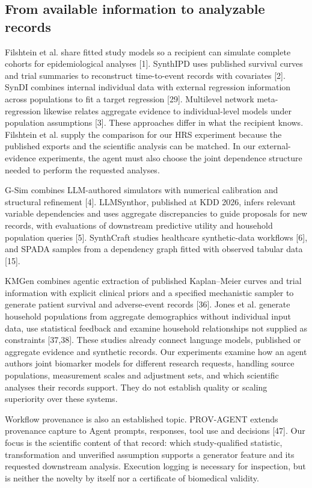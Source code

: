 \documentclass[11pt,letterpaper]{article}
\begin{document}
\subsection{From available information to analyzable records}

Filshtein et al. share fitted study models so a recipient can simulate complete cohorts for epidemiological analyses [1]. SynthIPD uses published survival curves and trial summaries to reconstruct time-to-event records with covariates [2]. SynDI combines internal individual data with external regression information across populations to fit a target regression [29]. Multilevel network meta-regression likewise relates aggregate evidence to individual-level models under population assumptions [3]. These approaches differ in what the recipient knows. Filshtein et al. supply the comparison for our HRS experiment because the published exports and the scientific analysis can be matched. In our external-evidence experiments, the agent must also choose the joint dependence structure needed to perform the requested analyses.


G-Sim combines LLM-authored simulators with numerical calibration and structural refinement [4]. LLMSynthor, published at KDD 2026, infers relevant variable dependencies and uses aggregate discrepancies to guide proposals for new records, with evaluations of downstream predictive utility and household population queries [5]. SynthCraft studies healthcare synthetic-data workflows [6], and SPADA samples from a dependency graph fitted with observed tabular data [15].


KMGen combines agentic extraction of published Kaplan–\allowbreak{}Meier curves and trial information with explicit clinical priors and a specified mechanistic sampler to generate patient survival and adverse-event records [36]. Jones et al. generate household populations from aggregate demographics without individual input data, use statistical feedback and examine household relationships not supplied as constraints [37,38]. These studies already connect language models, published or aggregate evidence and synthetic records. Our experiments examine how an agent authors joint biomarker models for different research requests, handling source populations, measurement scales and adjustment sets, and which scientific analyses their records support. They do not establish quality or scaling superiority over these systems.


Workflow provenance is also an established topic. PROV-AGENT extends provenance capture to Agent prompts, responses, tool use and decisions [47]. Our focus is the scientific content of that record: which study-qualified statistic, transformation and unverified assumption supports a generator feature and its requested downstream analysis. Execution logging is necessary for inspection, but is neither the novelty by itself nor a certificate of biomedical validity.
\end{document}
